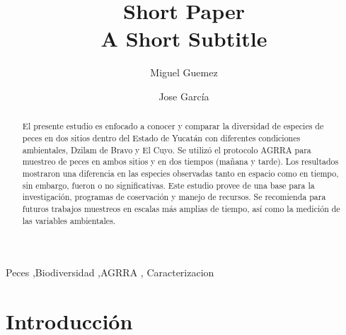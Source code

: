 \documentclass[
  authoryear,
  preprint,
  3p]{elsarticle}
\begin{document}
\begin{frontmatter}
\title{Short Paper \\\large{A Short Subtitle} }
\author[1]{Miguel Guemez%
%
}
\author[1]{Jose García%
%
}




        
\begin{abstract}
El presente estudio es enfocado a conocer y comparar la diversidad de
especies de peces en dos sitios dentro del Estado de Yucatán con
diferentes condiciones ambientales, Dzilam de Bravo y El Cuyo. Se
utilizó el protocolo AGRRA para muestreo de peces en ambos sitios y en
dos tiempos (mañana y tarde). Los resultados mostraron una diferencia en
las especies observadas tanto en espacio como en tiempo, sin embargo,
fueron o no significativas. Este estudio provee de una base para la
investigación, programas de coservación y manejo de recursos. Se
recomienda para futuros trabajos muestreos en escalas más amplias de
tiempo, así como la medición de las variables ambientales.
\end{abstract}





\begin{keyword}
    Peces \sep Biodiversidad \sep AGRRA \sep 
    Caracterizacion
\end{keyword}
\end{frontmatter}
    \ifdefined\Shaded\renewenvironment{Shaded}{\begin{tcolorbox}[borderline west={3pt}{0pt}{shadecolor}, frame hidden, interior hidden, sharp corners, enhanced, breakable, boxrule=0pt]}{\end{tcolorbox}}\fi

\hypertarget{introducciuxf3n}{%
\section{Introducción}\label{introducciuxf3n}}
\end{document}
